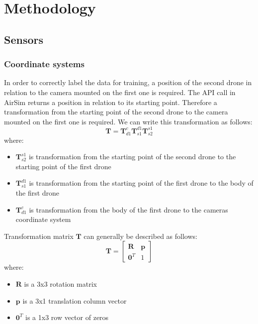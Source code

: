 \documentclass[twoside]{ctuthesis}
\theoremstyle{plain}
\theoremstyle{definition}
\theoremstyle{note}
\begin{document}
\maketitle

\part{Methodology}
\chapter{Sensors}
\section{Coordinate systems}
In order to correctly label the data for training, a position of the second drone in relation to the camera mounted on the first one is required. The API call in AirSim returns a position in relation to its starting point. Therefore a transformation from the starting point of the second drone to the camera mounted on the first one is required. We can write this transformation as follows:
\begin{equation}
	\textbf{T}=\textbf{T}_{d1}^{c}\textbf{T}_{s1}^{d1}\textbf{T}_{s2}^{s1}
\end{equation}
where:
\begin{itemize}
	\item $\textbf{T}_{s2}^{s1}$ is transformation from the starting point of the second drone to the starting point of the first drone
	\item $\textbf{T}_{s1}^{d1}$ is transformation from the starting point of the first drone to the body of the first drone
	\item $\textbf{T}_{d1}^{c}$ is transformation from the body of the first drone to the cameras coordinate system
\end{itemize}
Transformation matrix $\textbf{T}$ can generally be described as follows:
\begin{equation}
	\textbf{T}=\begin{bmatrix}
		\textbf{R} & \textbf{p}\\
		\textbf{0}^T & 1
	\end{bmatrix}
\end{equation}
where:
\begin{itemize}
	\item $\textbf{R}$ is a 3x3 rotation matrix
	\item $\textbf{p}$ is a 3x1 translation column vector
	\item $\textbf{0}^T$ is a 1x3 row vector of zeros
\end{itemize}
\end{document}
